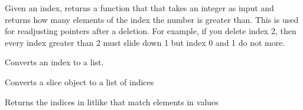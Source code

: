 \documentclass[letterpaper,10pt,english]{sphinxmanual}
\begin{document}

\begin{fulllineitems}
\label{\detokenize{Fireworks:Fireworks.core.cache.pointer_adjustment_function}}
Given an index, returns a function that that takes an integer as input and returns how many elements of the index the number is greater than.
This is used for readjusting pointers after a deletion. For example, if you delete index 2, then every index greater than 2 must slide down 1
but index 0 and 1 do not more.

\end{fulllineitems}


\begin{fulllineitems}
\label{\detokenize{Fireworks:Fireworks.core.cache.index_to_list}}
Converts an index to a list.

\end{fulllineitems}


\begin{fulllineitems}
\label{\detokenize{Fireworks:Fireworks.core.cache.slice_to_list}}
Converts a slice object to a list of indices

\end{fulllineitems}


\begin{fulllineitems}
\label{\detokenize{Fireworks:Fireworks.core.cache.get_indices}}
Returns the indices in litlike that match elements in values

\end{fulllineitems}

\label{\detokenize{Fireworks:module-Fireworks.toolbox.pipes}}
\end{document}
